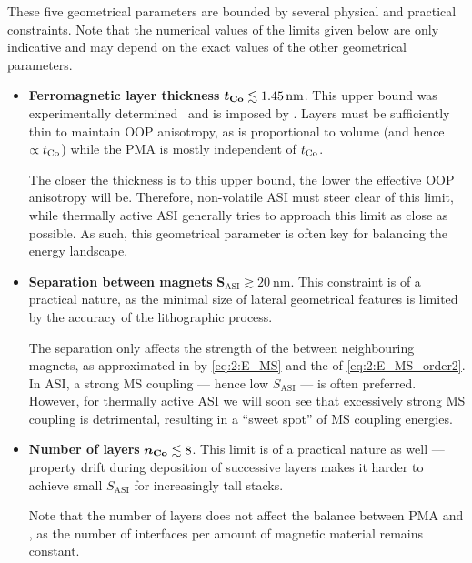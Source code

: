 These five geometrical parameters are bounded by several physical and practical constraints.
Note that the numerical values of the limits given below are only indicative and may depend on the exact values of the other geometrical parameters.
\begin{itemize}
	\item \textbf{Ferromagnetic layer thickness} $\boldsymbol{t_{\ce{Co}}} \lesssim \SI{1.45}{\nano\metre}$. \newline
	This upper bound was experimentally determined~\cite{KUR-24} and is imposed by .
	Layers must be sufficiently thin to maintain OOP anisotropy, as  is proportional to volume (and hence $\propto t_{\ce{Co}}$) while the PMA is mostly independent of $t_{\ce{Co}}$. \par %
	The closer the thickness is to this upper bound, the lower the effective OOP anisotropy will be.
	Therefore, non-volatile ASI must steer clear of this limit, while thermally active ASI generally tries to approach this limit as close as possible.
	As such, this geometrical parameter is often key for balancing the energy landscape.
	\item \textbf{Separation between magnets} $\boldsymbol{S_\mathrm{ASI}} \gtrsim \SI{20}{\nano\metre}$. \newline
	This constraint is of a practical nature, as the minimal size of lateral geometrical features is limited by the accuracy of the lithographic process. \par
	The separation only affects the strength of the  between neighbouring magnets, as approximated in \hotspice by \cref{eq:2:E_MS} and the  of \cref{eq:2:E_MS_order2}.
	In ASI, a strong MS coupling --- hence low $S_\mathrm{ASI}$ --- is often preferred.
	However, for thermally active ASI we will soon see that excessively strong MS coupling is detrimental, resulting in a ``sweet spot'' of MS coupling energies.
	\item \textbf{Number of layers} $\boldsymbol{n_{\ce{Co}}} \lesssim 8$. \newline
	This limit is of a practical nature as well --- property drift during deposition of successive layers makes it harder to achieve small $S_\mathrm{ASI}$ for increasingly tall stacks. \par
	Note that the number of layers does not affect the balance between PMA and , as the number of interfaces per amount of magnetic material remains constant.

\end{itemize}
